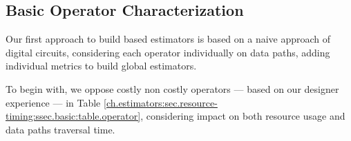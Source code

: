 \clearpage
    \subsection{Basic Operator Characterization}
    \label{ch.estimators:sec.resource-timing:ssec.basic}

        Our first approach to build \firrtl{} based estimators is based on a naive approach of digital circuits, considering each operator individually on data paths, adding individual metrics to build global estimators.

        To begin with, we oppose costly \vs non costly operators --- based on our designer experience --- in Table \ref{ch.estimators:sec.resource-timing:ssec.basic:table.operator}, considering impact on both resource usage and data paths traversal time.

